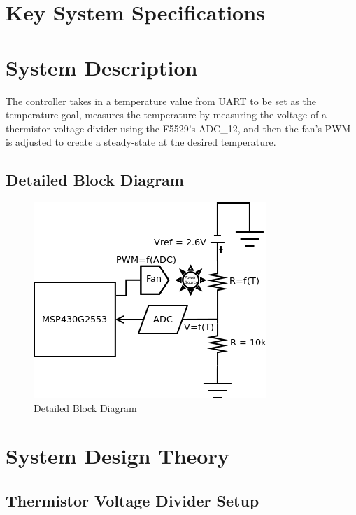 \documentclass{hitec}
\begin{document}
\section{Key System Specifications}

\section{System Description}
The controller takes in a temperature value from UART to be set as the
temperature goal, measures the temperature by measuring the voltage of a
thermistor voltage divider using the F5529's ADC\_12, and then the fan's PWM is
adjusted to create a steady-state at the desired temperature.

\subsection{Detailed Block Diagram}
\begin{figure}[H]
    \centering
    \includegraphics[scale=0.9]{detailed_block_diagram}
    \caption{Detailed Block Diagram}
    \label{fig:detailed_block_diagram}
\end{figure}

\section{System Design Theory}

\subsection{Thermistor Voltage Divider Setup}
\end{document}
